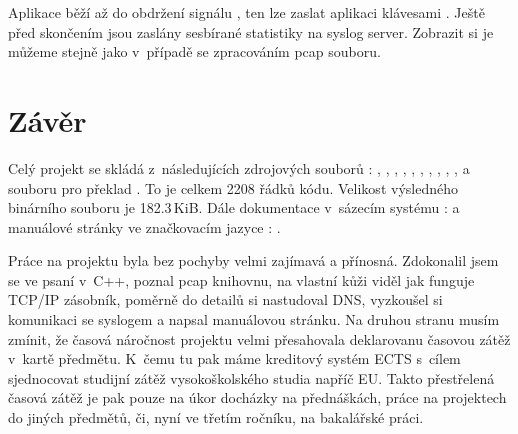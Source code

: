 \documentclass[11pt, a4paper, titlepage]{article}
\begin{document}
\begin{center}
\end{center}

\scriptsize






\normalsize

\medskip

Aplikace běží až do obdržení signálu , ten lze zaslat aplikaci klávesami . Ještě před skončením jsou zaslány sesbírané statistiky na syslog server. Zobrazit si je můžeme stejně jako v~případě se zpracováním pcap souboru.

\newpage


\section{Závěr}

Celý projekt se skládá z~následujících zdrojových souborů : , , , , , , , , , ,  a souboru pro překlad . To je celkem 2208 řádků kódu. Velikost výsledného binárního souboru  je 182.3\,KiB. Dále dokumentace v~sázecím systému :  a manuálové stránky ve značkovacím jazyce : .
\bigskip

Práce na projektu byla bez pochyby velmi zajímavá a přínosná. Zdokonalil jsem se ve psaní v~C++, poznal pcap knihovnu, na vlastní kůži viděl jak funguje TCP/IP zásobník, poměrně do detailů si nastudoval DNS, vyzkoušel si komunikaci se syslogem a napsal manuálovou stránku. Na druhou stranu musím zmínit, že časová náročnost projektu velmi přesahovala deklarovanu časovou zátěž v~kartě předmětu. K~čemu tu pak máme kreditový systém ECTS s~cílem sjednocovat studijní zátěž vysokoškolského studia napříč EU. Takto přestřelená časová zátěž je pak pouze na úkor docházky na přednáškách, práce na projektech do jiných předmětů, či, nyní ve třetím ročníku, na bakalářské práci.
\end{document}
